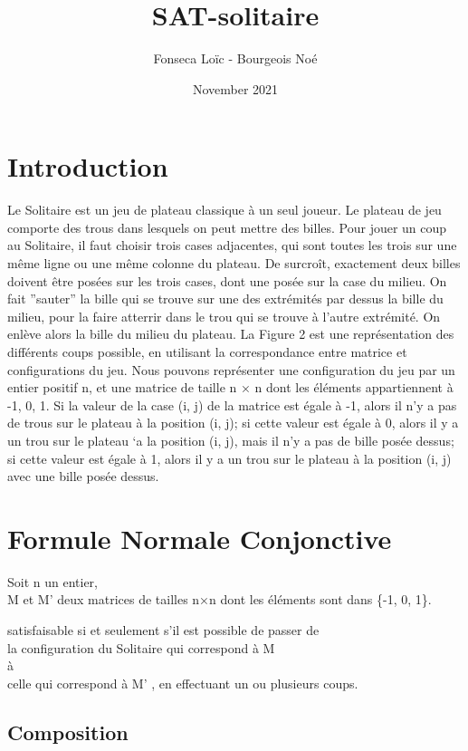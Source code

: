\documentclass[utf8]{article}
\title{SAT-solitaire}
\author{Fonseca Loïc - Bourgeois Noé}
\date{November 2021}
\begin{document}
\maketitle
\tableofcontents

\newpage


\section{Introduction}
Le Solitaire est un jeu de plateau classique à un seul joueur.
Le plateau de jeu comporte des trous dans lesquels on peut mettre des billes.
Pour jouer un coup au Solitaire, il faut choisir trois cases adjacentes, qui sont
toutes les trois sur une même ligne ou une même colonne du plateau. De surcroît,
exactement deux billes doivent être posées sur les trois cases, dont une posée sur
la case du milieu. On fait ”sauter” la bille qui se trouve sur une des extrémités
par dessus la bille du milieu, pour la faire atterrir dans le trou qui se trouve à
l’autre extrémité. On enlève alors la bille du milieu du plateau. La Figure 2 est
une représentation des différents coups possible, en utilisant la correspondance
entre matrice et configurations du jeu. Nous pouvons représenter une configuration du jeu par un entier positif n, et
une matrice de taille n × n dont les éléments appartiennent à {-1, 0, 1}. Si la
valeur de la case (i, j) de la matrice est égale à -1, alors il n’y a pas de trous
sur le plateau à la position (i, j); si cette valeur est égale à 0, alors il y a un
trou sur le plateau `a la position (i, j), mais il n’y a pas de bille posée dessus;
si cette valeur est égale à 1, alors il y a un trou sur le plateau à la position (i, j) avec une bille posée dessus.


\section{Formule Normale Conjonctive}
Soit n un entier, \\
M et M' deux matrices de tailles n×n
dont les éléments sont dans \{-1, 0, 1\}.


satisfaisable si et seulement s’il est possible de passer de
\\la configuration du Solitaire
qui correspond à M
\\à
\\celle qui correspond à M'
, en effectuant un ou
plusieurs coups.
\subsection{Composition}
\end{document}
